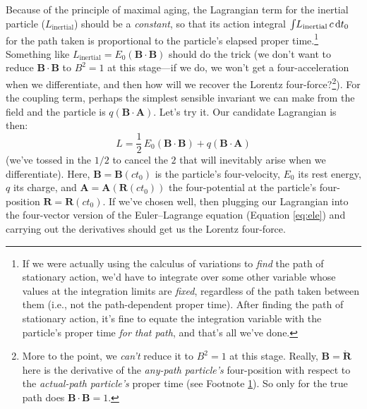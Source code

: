 \documentclass[12pt]{article}
\renewcommand{\vv}[1]{\mathbf{#1}}
\newcommand{\dd}[1]{\mathrm{d}#1}
\begin{document}
Because of the principle of maximal aging, the Lagrangian term for the inertial particle ($L_{\textrm{inertial}}$) should be a \emph{constant}, so that its action integral $\int \mkern-4mu L_{\textrm{inertial}} \, c \, \dd t_0$ for the path taken is proportional to the particle's elapsed proper time.\footnote{\label{fn:covpt}If we were actually using the calculus of variations to \emph{find} the path of stationary action, we'd have to integrate over some other variable whose values at the integration limits are \emph{fixed}, regardless of the path taken between them (i.e., not the path-dependent proper time). After finding the path of stationary action, it's fine to equate the integration variable with the particle's proper time \emph{for that path}, and that's all we've done.} Something like $L_{\textrm{inertial}} = E_0 (\vv B \cdot \vv B)$ should do the trick (we don't want to reduce $\vv B \cdot \vv B$ to $B^2 = 1$ at this stage---if we do, we won't get a four-acceleration when we differentiate, and then how will we recover the Lorentz four-force?\footnote{More to the point, we \emph{can't} reduce it to $B^2 = 1$ at this stage. Really, $\vv B = \mathring{\vv R}$ here is the derivative of the \emph{any-path particle's} four-position with respect to the \emph{actual-path particle's} proper time (see Footnote \ref{fn:covpt}). So only for the true path does $\vv B \cdot \vv B = 1$.}). For the coupling term, perhaps the simplest sensible invariant we can make from the field and the particle is $q (\vv B \cdot \vv A)$. Let's try it. Our candidate Lagrangian is then:
\begin{equation*}
L = \dfrac{1}{2} \, E_0 (\vv B \cdot \vv B) + q (\vv B \cdot \vv A)
\end{equation*}
(we've tossed in the $1/2$ to cancel the $2$ that will inevitably arise when we differentiate). Here, $\vv B = \vv B (ct_0)$ is the particle's four-velocity, $E_0$ its rest energy, $q$ its charge, and $\vv A = \vv A (\vv R (ct_0))$ the four-potential at the particle's four-position $\vv R = \vv R (ct_0)$. If we've chosen well, then plugging our Lagrangian into the four-vector version of the Euler--Lagrange equation (Equation \ref{eq:ele}) and carrying out the derivatives should get us the Lorentz four-force.
\end{document}
